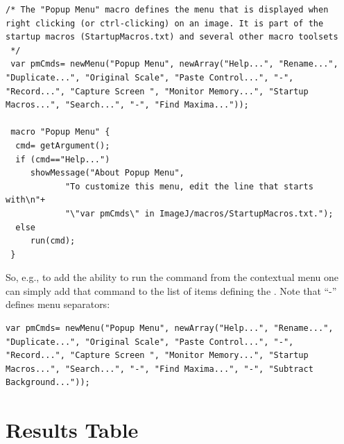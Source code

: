 \begin{lstlisting}[caption={Customizing the Image Popup Menu},label={lis:macro:PopupMenu},showstringspaces=false,tabsize=4]
 /* The "Popup Menu" macro defines the menu that is displayed when right clicking (or ctrl-clicking) on an image. It is part of the startup macros (StartupMacros.txt) and several other macro toolsets
 */
 var pmCmds= newMenu("Popup Menu", newArray("Help...", "Rename...", "Duplicate...", "Original Scale", "Paste Control...", "-", "Record...", "Capture Screen ", "Monitor Memory...", "Startup Macros...", "Search...", "-", "Find Maxima..."));

 macro "Popup Menu" {
  cmd= getArgument(); 
  if (cmd=="Help...")
     showMessage("About Popup Menu",
            "To customize this menu, edit the line that starts with\n"+
            "\"var pmCmds\" in ImageJ/macros/StartupMacros.txt.");
  else
     run(cmd);
 }
\end{lstlisting}


So, e.g., to add the ability to run the \textsf{}
command from the contextual menu one can simply add that command to
the list of items defining the \texttt{}.
Note that ``-'' defines menu separators:

\begin{lstlisting}[firstnumber=3,showstringspaces=false,tabsize=4]
 var pmCmds= newMenu("Popup Menu", newArray("Help...", "Rename...", "Duplicate...", "Original Scale", "Paste Control...", "-", "Record...", "Capture Screen ", "Monitor Memory...", "Startup Macros...", "Search...", "-", "Find Maxima...", "-", "Subtract Background..."));
\end{lstlisting}



\section{Results Table\label{sec:Results-Table}}

